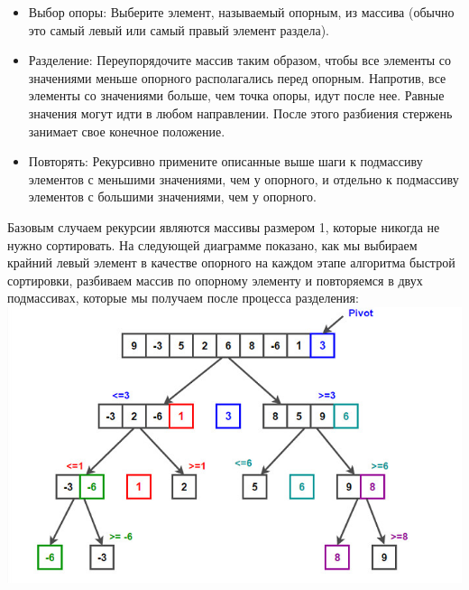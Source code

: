 \documentclass[a4paper, 12pt]{article}
\begin{document}
\begin{flushleft}
 \begin{itemize}
 \item {Выбор опоры: Выберите элемент, называемый опорным, из массива (обычно это самый левый или самый правый элемент раздела).}
\item {Разделение: Переупорядочите массив таким образом, чтобы все элементы со значениями меньше опорного располагались перед опорным. Напротив, все элементы со значениями больше, чем точка опоры, идут после нее. Равные значения могут идти в любом направлении. После этого разбиения стержень занимает свое конечное положение.}
\item {Повторять: Рекурсивно примените описанные выше шаги к подмассиву элементов с меньшими значениями, чем у опорного, и отдельно к подмассиву элементов с большими значениями, чем у опорного.}
\end{itemize}
Базовым случаем рекурсии являются массивы размером 1, которые никогда не нужно сортировать. На следующей диаграмме показано, как мы выбираем крайний левый элемент в качестве опорного на каждом этапе алгоритма быстрой сортировки, разбиваем массив по опорному элементу и повторяемся в двух подмассивах, которые мы получаем после процесса разделения:
\includegraphics[scale=0.7]{1.jpg}\\
 \end{flushleft}
\end{document}
